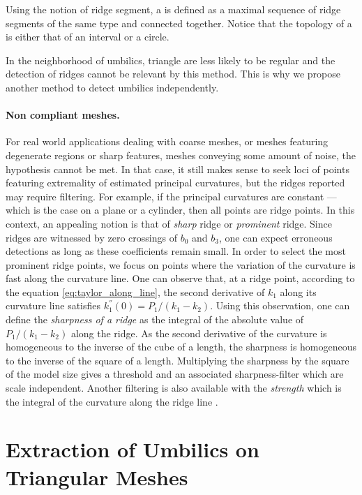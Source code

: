 Using the notion of ridge segment, a  is defined as a
maximal sequence of ridge segments of the same type and connected
together.  Notice that the topology of a  is either
that of an interval or a circle.

  In the neighborhood of umbilics,
triangle are less likely to be regular and the detection of ridges
cannot be relevant by this method.  This is why we propose another
method to detect umbilics independently.

\paragraph{Non compliant meshes.}
For real world applications dealing with coarse meshes, or meshes
featuring degenerate regions or sharp features, meshes conveying some
amount of noise, the hypothesis \cite{cgal:cp-tdare-05} cannot be
met. In that case, it still makes sense to seek loci of points
featuring extremality of estimated principal curvatures, but the
ridges reported may require filtering. For example, if the principal
curvatures are constant ---which is the case on a plane or a cylinder,
then all points are ridge points. In this context, an appealing notion
is that of {\em sharp} ridge or {\em prominent} ridge. Since ridges
are witnessed by zero crossings of $b_0$ and $b_3$, one can expect
erroneous detections as long as these coefficients remain small. In
order to select the most prominent ridge points, we focus on points
where the variation of the curvature is fast along the curvature line.
One can observe that, at a ridge point, according to the equation
\ref{eq:taylor_along_line}, the second derivative of $k_1$ along its
curvature line satisfies $k_1^{''}(0) = P_1/(k_1-k_2)$.  Using this
observation, one can define the {\em sharpness of a ridge} as the
integral of the absolute value of $P_1/(k_1-k_2)$ along the ridge. As
the second derivative of the curvature is homogeneous to the inverse
of the cube of a length, the sharpness is homogeneous to the inverse
of the square of a length. Multiplying the sharpness by the square of
the model size gives a threshold and an associated sharpness-filter
which are scale independent. Another filtering is also available with
the {\em strength } which is the integral of the curvature along the
ridge line
\cite{cgal:ybs-rvlmi-04}.





\section{Extraction of Umbilics on Triangular Meshes}
\label{umbilic-mesh}

